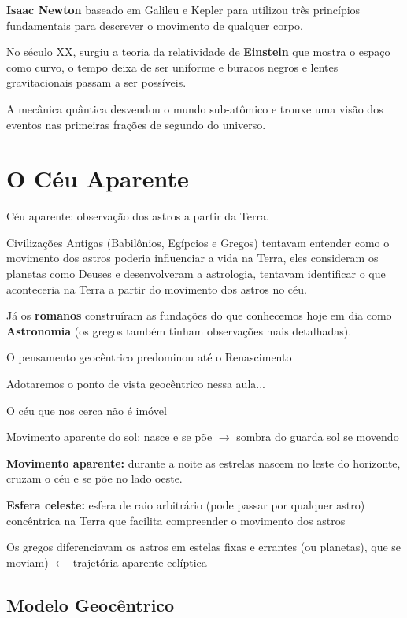 \documentclass{article}
\begin{document}
\textbf{Isaac Newton} baseado em Galileu e Kepler para utilizou três princípios 
fundamentais para descrever o movimento de qualquer corpo.

No século XX, surgiu a teoria da relatividade de \textbf{Einstein} que mostra
o espaço como curvo, o tempo deixa de ser uniforme e buracos negros 
e lentes gravitacionais passam a ser possíveis.

A mecânica quântica desvendou o mundo sub-atômico e trouxe uma visão
dos eventos nas primeiras frações de segundo do universo.

\section{O Céu Aparente}

Céu aparente: observação dos astros a partir da Terra.

Civilizações Antigas (Babilônios, Egípcios e Gregos) tentavam 
entender como o movimento dos astros poderia influenciar a vida 
na Terra, eles consideram os planetas como Deuses e desenvolveram
a astrologia, tentavam identificar o que aconteceria na Terra a partir
do movimento dos astros no céu.

Já os \textbf{romanos} construíram as fundações do que conhecemos 
hoje em dia como \textbf{Astronomia} (os gregos também tinham observações
mais detalhadas).

O pensamento geocêntrico predominou até o Renascimento

Adotaremos o ponto de vista geocêntrico nessa aula...

O céu que nos cerca não é imóvel

Movimento aparente do sol: nasce e se põe $\rightarrow$ sombra do 
guarda sol se movendo

\textbf{Movimento aparente:} durante a noite as estrelas nascem no leste do
horizonte, cruzam o céu e se põe no lado oeste.

\textbf{Esfera celeste:} esfera de raio arbitrário (pode passar por
qualquer astro) concêntrica na 
Terra que facilita compreender o movimento dos astros 


Os gregos diferenciavam os astros em estelas fixas e errantes (ou planetas), que se 
moviam) $\leftarrow$ trajetória aparente eclíptica

\subsection{Modelo Geocêntrico}
\end{document}
